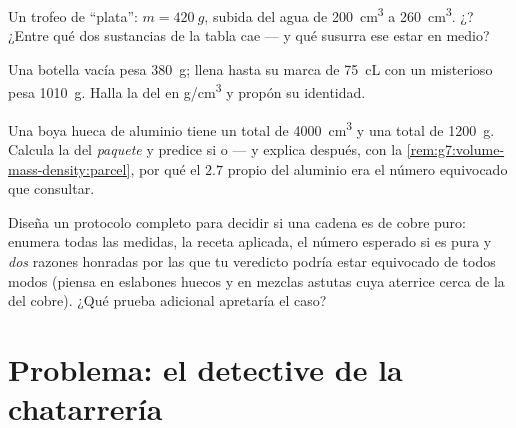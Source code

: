 \begin{exercise}[$\star\star$]\label{exo:g7:volume-mass-density:9}
Un trofeo de ``plata'': $m = \qty{420}{g}$, subida del agua de
\qty{200}{cm^3} a \qty{260}{cm^3}. ¿? ¿Entre qué dos
sustancias de la tabla cae --- y qué susurra ese estar en medio?
\end{exercise}

\begin{exercise}[$\star\star$]\label{exo:g7:volume-mass-density:10}
Una botella vacía pesa \qty{380}{g}; llena hasta su marca de
\qty{75}{cL} con un  misterioso pesa \qty{1010}{g}. Halla la
 del  en \unit{g/cm^3} y propón su identidad.
\end{exercise}

\begin{exercise}[$\star\star$]\label{exo:g7:volume-mass-density:11}
Una boya hueca de aluminio tiene un  total de
\qty{4000}{cm^3} y una  total de \qty{1200}{g}. Calcula la
 del \emph{paquete} y predice si  o
 --- y explica después, con la
\cref{rem:g7:volume-mass-density:parcel}, por qué el $2.7$ propio del
aluminio era el número equivocado que consultar.
\end{exercise}

\begin{exercise}[$\star\star\star$]\label{exo:g7:volume-mass-density:12}
Diseña un protocolo completo para decidir si una cadena es de cobre
puro: enumera todas las medidas, la receta aplicada, el número
esperado si es pura y \emph{dos} razones honradas por las que tu
veredicto podría estar equivocado de todos modos (piensa en eslabones
huecos y en mezclas astutas cuya  aterrice cerca de la del
cobre). ¿Qué prueba adicional apretaría el caso?
\end{exercise}

\section{Problema: el detective de la chatarrería}

